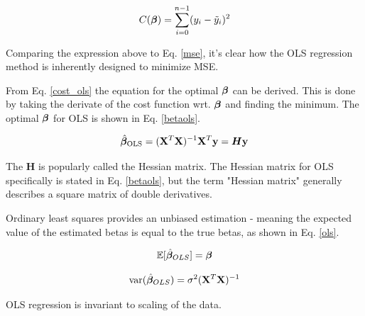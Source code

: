 \begin{equation}\label{cost_ols}
    C(\boldsymbol{\beta}) = \sum_{i=0}^{n-1}(y_i-\Tilde{y}_i)^2
\end{equation}

Comparing the expression above to Eq. \ref{mse}, it's clear how the OLS regression method is inherently designed to minimize MSE.

From Eq. \ref{cost_ols} the equation for the optimal $\boldsymbol{\beta}$ can be derived. This is done by taking the derivate of the cost function wrt. $\boldsymbol{\beta}$ and finding the minimum. The optimal $\boldsymbol{\beta}$ for OLS is shown in Eq. \ref{betaols}. 

\begin{equation}\label{betaols}
    \hat{\boldsymbol{\beta}}_{\text{OLS}} = (\mathbf{X}^T\mathbf{X})^{-1}\mathbf{X}^T\mathbf{y} = \boldsymbol{H}\mathbf{y}
\end{equation}

The $\boldsymbol{H}$ is popularly called the Hessian matrix. The Hessian matrix for OLS specifically is stated in Eq. \ref{betaols}, but the term "Hessian matrix" generally describes a square matrix of double derivatives.


Ordinary least squares provides an unbiased estimation - meaning the expected value of the estimated betas is equal to the true betas, as shown in Eq. \ref{ols}.  

\begin{equation}\label{ols}
    \mathbb{E}[\hat{\boldsymbol{\beta}}_{OLS}] = \boldsymbol{\beta}
\end{equation}

\begin{equation}
   \text{var}(\hat{\boldsymbol{\beta}}_{OLS}) = \sigma^2 (\mathbf{X}^T\mathbf{X})^{-1}
\end{equation}

OLS regression is invariant to scaling of the data.



